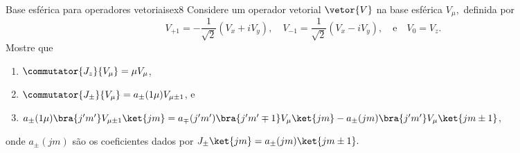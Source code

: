 \begin{exercício}{Base esférica para operadores vetoriais}{ex8}
    Considere um operador vetorial \(\vetor{V}\) na base esférica \(V_\mu,\) definida por
    \begin{equation*}
        V_{+1} = -\frac1{\sqrt{2}} (V_x + i V_y),
        \quad
        V_{-1} = \frac1{\sqrt{2}} (V_x - i V_y),
        \quad\text{e}\quad
        V_0 = V_z.
    \end{equation*}
    Mostre que
    \begin{enumerate}[label=(\alph*)]
        \item \(\commutator{J_z}{V_\mu} = \mu V_\mu\),
        \item \(\commutator{J_\pm}{V_\mu} = a_{\pm}(1\mu) V_{\mu \pm 1}\), e
        \item \(a_{\pm}(1\mu) \bra{j' m'} V_{\mu \pm 1} \ket{j m} = a_{\mp}(j'm') \bra{j'm' \mp 1} V_\mu \ket{j m} - a_{\pm}(jm) \bra{j'm'} V_\mu \ket{j m \pm 1}\),
    \end{enumerate}
    onde \(a_{\pm}(jm)\) são os coeficientes dados por \(J_{\pm} \ket{jm} = a_{\pm}(jm) \ket{j m\pm1}.\)
\end{exercício}
